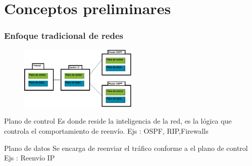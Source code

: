 \documentclass{beamer}
\begin{document}
\section{Conceptos preliminares} 
\frame{\tableofcontents[currentsection]}

\begin{frame}
\frametitle{Enfoque tradicional de redes} 



	\begin{figure}[H]
		\raggedright
		\includegraphics[width=0.5\textwidth, center]{imagenes/SDN-tradicional.png}
	\end{figure}

\hfill


\begin{block}{Plano de control}
Es donde reside la inteligencia de la red, es la l\'ogica que controla el comportamiento de reenv\'io. Ejs : OSPF, RIP,Firewalls
\end{block}



\begin{block}{Plano de datos}
Se encarga de reenviar el tr\'afico conforme a el plano de control Ejs : Reenv\'io IP
 
\end{block}


\end{frame}
\end{document}
